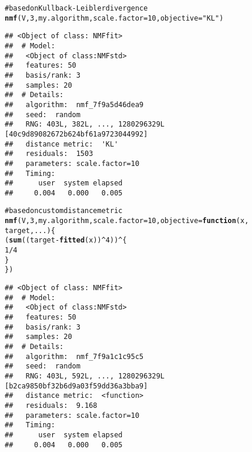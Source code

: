 \documentclass[a4paper]{article}\usepackage{graphicx, color}
\makeatletter
\newcommand{\hlfunctioncall}[1]{\textcolor[rgb]{0.501960784313725,0,0.329411764705882}{\textbf{#1}}}%
\newcommand{\hlstring}[1]{\textcolor[rgb]{0.6,0.6,1}{#1}}%
\newcommand{\hlcomment}[1]{\textcolor[rgb]{0.180392156862745,0.6,0.341176470588235}{#1}}%
\newenvironment{kframe}{%
 \def\at@end@of@kframe{}%
 \ifinner\ifhmode%
  \def\at@end@of@kframe{\end{minipage}}%
  \begin{minipage}{\columnwidth}%
 \fi\fi%
 \def\FrameCommand##1{\hskip\@totalleftmargin \hskip-\fboxsep
 \colorbox{shadecolor}{##1}\hskip-\fboxsep
     \hskip-\linewidth \hskip-\@totalleftmargin \hskip\columnwidth}%
 \MakeFramed {\advance\hsize-\width
   \@totalleftmargin\z@ \linewidth\hsize
   \@setminipage}}%
 {\par\unskip\endMakeFramed%
 \at@end@of@kframe}
\newenvironment{knitrout}{}{} %
\makeatother
\begin{document}
\begin{knitrout}
\color{fgcolor}\begin{kframe}
\begin{alltt}
\hlcomment{# based on Kullback-Leibler divergence}
\hlfunctioncall{nmf}(V, 3, my.algorithm, scale.factor = 10, objective = \hlstring{"KL"})
\end{alltt}
\begin{verbatim}
## <Object of class: NMFfit>
##  # Model:
##   <Object of class:NMFstd>
##   features: 50 
##   basis/rank: 3 
##   samples: 20 
##  # Details:
##   algorithm:  nmf_7f9a5d46dea9 
##   seed:  random 
##   RNG: 403L, 382L, ..., 1280296329L [40c9d89082672b624bf61a9723044992]
##   distance metric:  'KL' 
##   residuals:  1503 
##   parameters: scale.factor=10 
##   Timing:
##      user  system elapsed 
##     0.004   0.000   0.005
\end{verbatim}
\begin{alltt}
\hlcomment{# based on custom distance metric}
\hlfunctioncall{nmf}(V, 3, my.algorithm, scale.factor = 10, objective = \hlfunctioncall{function}(x, 
    target, ...) \{
    (\hlfunctioncall{sum}((target - \hlfunctioncall{fitted}(x))^4))^\{
        1/4
    \}
\})
\end{alltt}
\begin{verbatim}
## <Object of class: NMFfit>
##  # Model:
##   <Object of class:NMFstd>
##   features: 50 
##   basis/rank: 3 
##   samples: 20 
##  # Details:
##   algorithm:  nmf_7f9a1c1c95c5 
##   seed:  random 
##   RNG: 403L, 592L, ..., 1280296329L [b2ca9850bf32b6d9a03f59dd36a3bba9]
##   distance metric:  <function> 
##   residuals:  9.168 
##   parameters: scale.factor=10 
##   Timing:
##      user  system elapsed 
##     0.004   0.000   0.005
\end{verbatim}
\end{kframe}
\end{knitrout}


%
%
\end{document}
